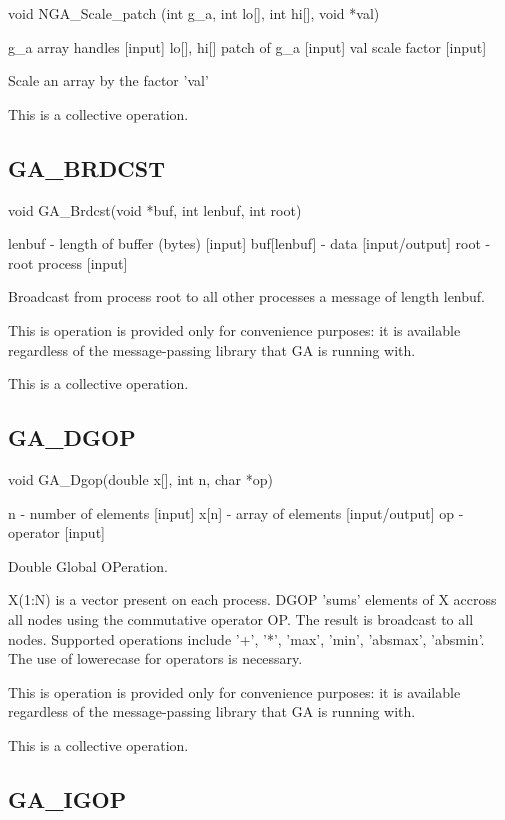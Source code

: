 void NGA\_Scale\_patch (int g\_a, int lo{[}{]}, int hi{[}{]}, void
{*}val)

g\_a array handles {[}input{]} lo{[}{]}, hi{[}{]} patch of g\_a {[}input{]}
val scale factor {[}input{]}

Scale an array by the factor 'val'

This is a collective operation. 


\subsection*{GA\_BRDCST}

void GA\_Brdcst(void {*}buf, int lenbuf, int root)

lenbuf - length of buffer (bytes) {[}input{]} buf{[}lenbuf{]} - data
{[}input/output{]} root - root process {[}input{]}

Broadcast from process root to all other processes a message of length
lenbuf.

This is operation is provided only for convenience purposes: it is
available regardless of the message-passing library that GA is running
with.

This is a collective operation. 


\subsection*{GA\_DGOP}

void GA\_Dgop(double x{[}{]}, int n, char {*}op)

n - number of elements {[}input{]} x{[}n{]} - array of elements {[}input/output{]}
op - operator {[}input{]}

Double Global OPeration.

X(1:N) is a vector present on each process. DGOP 'sums' elements of
X accross all nodes using the commutative operator OP. The result
is broadcast to all nodes. Supported operations include '+', '{*}',
'max', 'min', 'absmax', 'absmin'. The use of lowerecase for operators
is necessary.

This is operation is provided only for convenience purposes: it is
available regardless of the message-passing library that GA is running
with.

This is a collective operation. 


\subsection*{GA\_IGOP}

